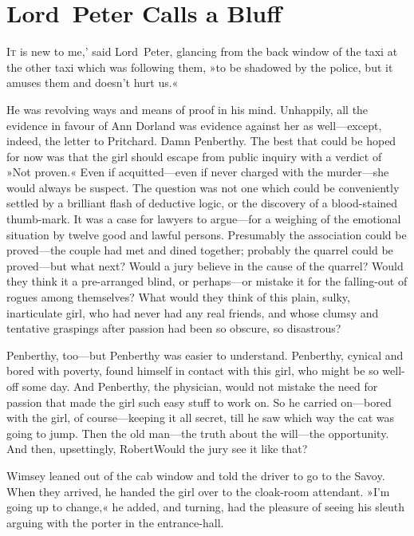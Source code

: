 \chapter{Lord~Peter Calls a Bluff}

\lettrine[lines=4,ante=‘]{I}{t} is new to me,' said Lord~Peter, glancing from the back window of the taxi at the other taxi which was following them, »to be shadowed by the police, but it amuses them and doesn't hurt us.«

\zz
He was revolving ways and means of proof in his mind. Unhappily, all the evidence in favour of Ann Dorland was evidence against her as well—except, indeed, the letter to Pritchard. Damn Penberthy. The best that could be hoped for now was that the girl should escape from public inquiry with a verdict of »Not proven.« Even if acquitted—even if never charged with the murder—she would always be suspect. The question was not one which could be conveniently settled by a brilliant flash of deductive logic, or the discovery of a blood-stained thumb-mark. It was a case for lawyers to argue—for a weighing of the emotional situation by twelve good and lawful persons. Presumably the association could be proved—the couple had met and dined together; probably the quarrel could be proved—but what next? Would a jury believe in the cause of the quarrel? Would they think it a pre-arranged blind, or perhaps—or mistake it for the falling-out of rogues among themselves? What would they think of this plain, sulky, inarticulate girl, who had never had any real friends, and whose clumsy and tentative graspings after passion had been so obscure, so disastrous?

Penberthy, too—but Penberthy was easier to understand. Penberthy, cynical and bored with poverty, found himself in contact with this girl, who might be so well-off some day. And Penberthy, the physician, would not mistake the need for passion that made the girl such easy stuff to work on. So he carried on—bored with the girl, of course—keeping it all secret, till he saw which way the cat was going to jump. Then the old man—the truth about the will—the opportunity. And then, upsettingly, Robert\textellipsis Would the jury see it like that?

Wimsey leaned out of the cab window and told the driver to go to the Savoy. When they arrived, he handed the girl over to the cloak-room attendant. »I'm going up to change,« he added, and turning, had the pleasure of seeing his sleuth arguing with the porter in the entrance-hall.

